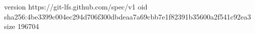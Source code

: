 version https://git-lfs.github.com/spec/v1
oid sha256:4be3399c004ec294d706f300dbdeaa7a69cbb7e1f82391b35600a2f541c92ea3
size 196704
